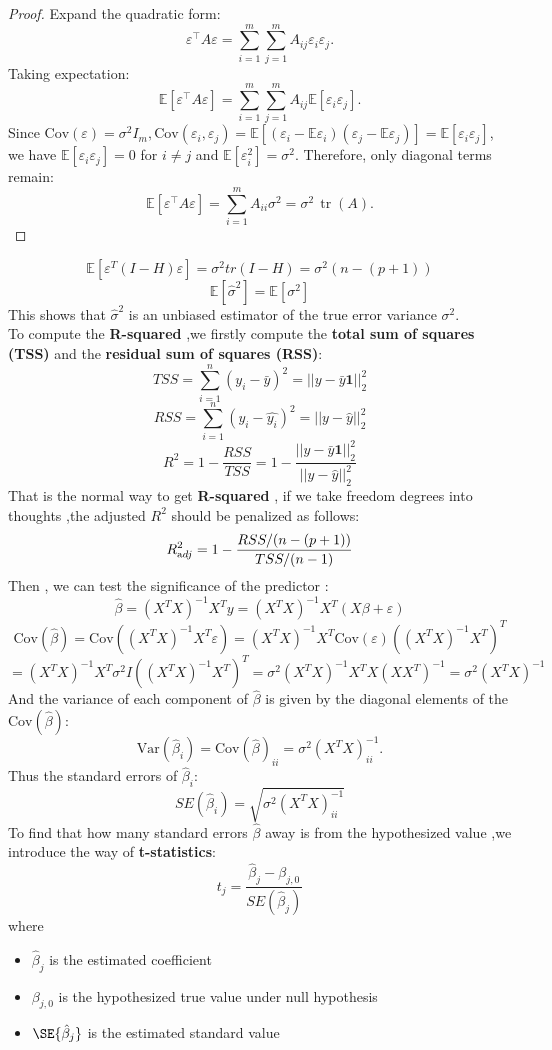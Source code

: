 \documentclass[a4paper, 12pt]{article}
\newcommand{\E}{\mathbb{E}}      %
\newcommand{\Var}{\mathrm{Var}} %
\begin{document}
\begin{proof}
Expand the quadratic form:
\[
\varepsilon^\top A \varepsilon = \sum_{i=1}^m \sum_{j=1}^m A_{ij} \varepsilon_i \varepsilon_j.
\]
Taking expectation:
\[
\mathbb{E}[\varepsilon^\top A \varepsilon] = \sum_{i=1}^m \sum_{j=1}^m A_{ij} \mathbb{E}[\varepsilon_i \varepsilon_j].
\]
Since $\text{Cov}(\varepsilon) = \sigma^2 I_m , \text{Cov}(\varepsilon_i,\varepsilon_j)= \E [(\varepsilon_i- \E \varepsilon_i)(\varepsilon_j -\E \varepsilon_j)]=\E[\varepsilon_i\varepsilon_j] $, we have $\mathbb{E}[\varepsilon_i \varepsilon_j] = 0$ for $i \neq j$ and $\mathbb{E}[\varepsilon_i^2] = \sigma^2$. Therefore, only diagonal terms remain:
\[
\mathbb{E}[\varepsilon^\top A \varepsilon] = \sum_{i=1}^m A_{ii} \sigma^2 = \sigma^2 \, \operatorname{tr}(A).
\]
\end{proof}
$$\E [\varepsilon^T(I-H)\varepsilon]=\sigma^2 tr(I-H) =\sigma^2 (n -(p+1))$$
$$\mathbb{E} [\hat{\sigma}^2]= \E [\sigma^2]$$
This shows that $\hat \sigma^2$ is an unbiased estimator of the true error variance $\sigma^2$.\\
To compute the \textbf{R-squared} ,we firstly compute the \textbf{total sum of squares (TSS)} and the \textbf{residual sum of squares (RSS)}:
$$TSS = \sum_{i=1}^n (y_i - \bar y)^2 =||y - \bar y \textbf{1}||^2_2$$
$$RSS = \sum_{i=1}^n (y_i - \hat{y_i})^2 = ||y - \hat y||^2_2$$
$$R^2 = 1- \dfrac {RSS}{TSS} = 1 - \dfrac{||y - \bar y \textbf{1}||^2_2}{||y - \hat y||^2_2}$$
That is the normal way to get \textbf{R-squared} , if we take freedom degrees into thoughts ,the adjusted $R^2$ should be penalized as follows:
$$R^2_{\text adj}= 1- \dfrac{RSS/(n-(p+1))}{TSS/(n-1)}$$
Then , we can test the significance of the predictor :
$$\hat \beta = (X^TX)^{-1}X^T y = (X^TX)^{-1}X^T (X\beta +\varepsilon)$$
$$\text{Cov}(\hat \beta) = \text{Cov}((X^TX)^{-1}X^T\varepsilon) = (X^TX)^{-1}X^T\text{Cov}(\varepsilon) ((X^TX)^{-1}X^T)^T $$
$$= (X^TX)^{-1}X^T \sigma^2 I((X^TX)^{-1}X^T)^T = \sigma^2 (X^TX)^{-1}X^TX(XX^T)^{-1}=\sigma^2 (X^TX)^{-1}$$
And the variance of each component of $\hat \beta$ is given by the diagonal elements of the $\text{Cov} (\hat \beta) $:
$$\Var(\hat \beta_i ) =\text{Cov}(\hat \beta)_{ii} = \sigma^2(X^TX)^{-1}_{ii}. $$
Thus the standard errors of $\hat\beta_i$:
$$SE(\hat \beta_i)=\sqrt{\sigma^2(X^TX)^{-1}_{ii}}$$
To find that how many standard errors $\hat \beta$ away is from the hypothesized value ,we introduce the way of \textbf{t-statistics}:
$$t_j= \frac{\hat\beta_j - \beta_{j,0}}{SE(\hat \beta_j)}$$
where
\begin{itemize}
  \item $\hat \beta_j$ is the estimated coefficient
  \item $\beta_{j,0}$ is the hypothesized true value under null hypothesis
  \item $\SE{\hat \beta_j}$ is the estimated standard value 
\end{itemize}
\end{document}
